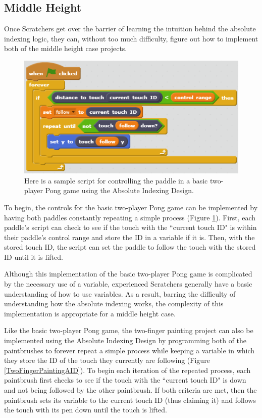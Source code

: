 \subsection{Middle Height}

Once Scratchers get over the barrier of learning the intuition behind the  absolute indexing logic, they can, without too much difficulty, figure out how to implement both of the middle height case projects.

\begin{figure}
\centering
\includegraphics{images/BasicTwoPlayerPongAID.PNG}
\caption[Sample Absolute Indexing Design Script For Basic Two-Player Pong]
{Here is a sample script for controlling the paddle in a basic two-player Pong game using the Absolute Indexing Design.}
\label{BasicTwoPlayerPongAID}
\end{figure}

To begin, the controls for the basic two-player Pong game can be implemented by having both paddles constantly repeating a simple process (Figure \ref{BasicTwoPlayerPongAID}). First, each paddle's script can check to see if the touch with the ``current touch ID" is within their paddle's control range and store the ID in a variable if it is. Then, with the stored touch ID, the script can set the paddle to follow the touch with the stored ID until it is lifted.

Although this implementation of the basic two-player Pong game is complicated by the necessary use of a variable, experienced Scratchers generally have a basic understanding of how to use variables. As a result, barring the difficulty of understanding how the absolute indexing works, the complexity of this implementation is appropriate for a middle height case.

Like the basic two-player Pong game, the two-finger painting project can also be implemented using the Absolute Indexing Design by programming both of the paintbrushes to forever repeat a simple process while keeping a variable in which they store the ID of the touch they currently are following (Figure \ref{TwoFingerPaintingAID}). To begin each iteration of the repeated process, each paintbrush first checks to see if the touch with the ``current touch ID" is down and not being followed by the other paintbrush. If both criteria are met, then the paintbrush sets its variable to the current touch ID (thus claiming it) and follows the touch with its pen down until the touch is lifted.

